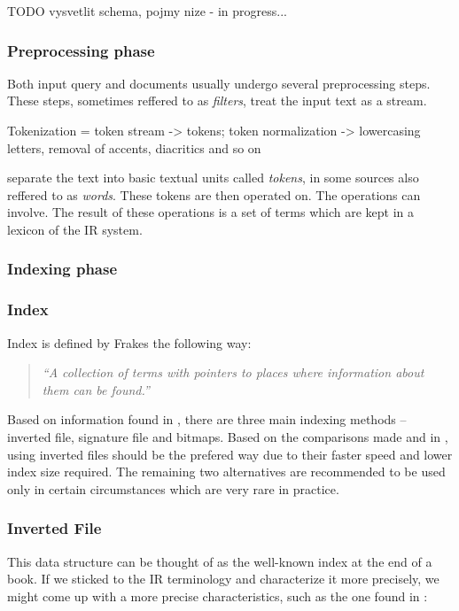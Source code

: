 TODO vysvetlit schema, pojmy nize - in progress...

\subsubsection{Preprocessing phase}

Both input query and documents usually undergo several preprocessing steps. These steps, sometimes reffered to as \textsl{filters},   
treat the input text as a stream. 

Tokenization = token stream -> tokens; token normalization -> lowercasing letters, removal of accents, diacritics and so on

separate the text into basic textual units called \textsl{tokens}, in some sources also reffered to as \textsl{words}. These tokens are then operated on. The operations can involve. The result of these operations is a set of terms which are kept in a lexicon of the IR system. 

\subsubsection{Indexing phase}

\subsubsection*{Index}

Index is defined by Frakes \cite{IRDataAlgorithms} the following way: 
	\begin{quote}
	\textsl{``A collection of terms with pointers to places where information about them can be found.''} 	
	\end{quote}
Based on information found in \cite{ManningRaghavanSchuetze08, IRDataAlgorithms, Witten:1999:MGC:323905}, there are three main indexing methods – inverted file, signature file and bitmaps. Based on the comparisons made \cite{Witten:1999:MGC:323905} and in \cite{Zobel:1996:GPC:234889.234891}, using inverted files should be the prefered way due to their faster speed and lower index size required. The remaining two alternatives are recommended to be used only in certain circumstances which are very rare in practice. 

\subsubsection*{Inverted File}

This data structure can be thought of as the well-known index at the end of a book. If we sticked to the IR terminology and characterize it more precisely, we might come up with a more precise characteristics, such as the one found in \cite{Witten:1999:MGC:323905}:

